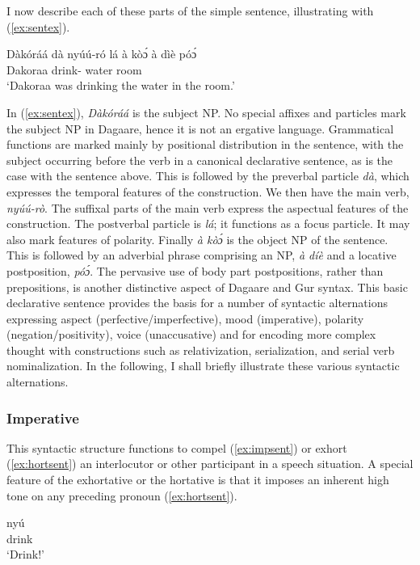 I now describe each of these parts of the simple sentence, illustrating with (\ref{ex:sentex}).

\ea \label{ex:sentex} \gll Dàkóráá dà nyúú-ró lá à kòɔ́ à dìè póɔ́\\
Dakoraa {\PST} drink-{\IMPF} {\FOC} {\DEF} water {\DEF} room \POSTP\\
\glt ‘Dakoraa was drinking the water in the room.’\z 

In (\ref{ex:sentex}), \textit{Dàkóráá} is the subject NP. No special affixes and particles mark the subject NP in
Dagaare, hence it is not an ergative language. Grammatical functions are marked mainly by
positional distribution in the sentence, with the subject occurring before the verb in a
canonical declarative sentence, as is the case with the sentence above. This is followed by the
preverbal particle \textit{dà}, which expresses the temporal features of the construction. We then
have the main verb, \textit{nyúú-rò}. The suffixal parts of the main verb express the aspectual
features of the construction. The postverbal particle is \textit{lá}; it functions as a focus particle. It
may also mark features of polarity. Finally \textit{à kòɔ́} is the object NP of the sentence. This is
followed by an adverbial phrase comprising an NP, \textit{à díè} and a locative postposition, \textit{póɔ́}.
The pervasive use of body part postpositions, rather than prepositions, is another distinctive
aspect of Dagaare and Gur syntax.
This basic declarative sentence provides the basis for a number of syntactic
alternations expressing aspect (perfective/imperfective), mood (imperative), polarity
(negation/positivity), voice (unaccusative) and for encoding more complex thought with constructions such as relativization, serialization, and serial verb nominalization.
In the following, I shall briefly illustrate these various syntactic alternations.

\subsubsection{Imperative}
This syntactic structure functions to compel (\ref{ex:impsent}) or exhort (\ref{ex:hortsent}) an interlocutor or other
participant in a speech situation. A special feature of the exhortative or the hortative is that it
imposes an inherent high tone on any preceding pronoun (\ref{ex:hortsent}).

\ea \label{ex:impsent} \gll nyú\\
drink\\
\glt ‘Drink!’\z

